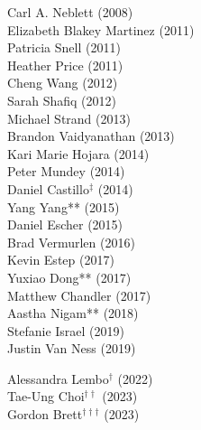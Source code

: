 \medskip
{}
\begin{multicols}{2}
\noindent
    Carl A. Neblett (2008) \\
    Elizabeth Blakey Martinez (2011) \\
    Patricia Snell (2011) \\
    Heather Price (2011) \\
    Cheng Wang (2012) \\
    Sarah Shafiq (2012) \\
    Michael Strand (2013) \\
    Brandon Vaidyanathan (2013) \\
    Kari Marie Hojara (2014) \\
    Peter Mundey (2014) \\
    Daniel Castillo\textcolor{uclablue}{$^{\ddag}$} (2014)  \\
    Yang Yang\textcolor{uclablue}{**} (2015) \\
    Daniel Escher (2015) \\
    Brad Vermurlen (2016) \\
    Kevin Estep (2017) \\
    Yuxiao Dong\textcolor{uclablue}{**}  (2017) \\
    Matthew Chandler (2017) \\
    Aastha Nigam\textcolor{uclablue}{**}  (2018) \\
    Stefanie Israel (2019) \\
    Justin Van Ness (2019) 
\end{multicols}

\begin{multicols}{2} \noindent
    Alessandra Lembo\textcolor{uclablue}{$^{\dag}$} (2022) \\
    Tae-Ung Choi\textcolor{uclablue}{$^{\dag \dag}$} (2023) \\
    Gordon Brett\textcolor{uclablue}{$^{\dag \dag \dag}$} (2023) \\
\end{multicols}